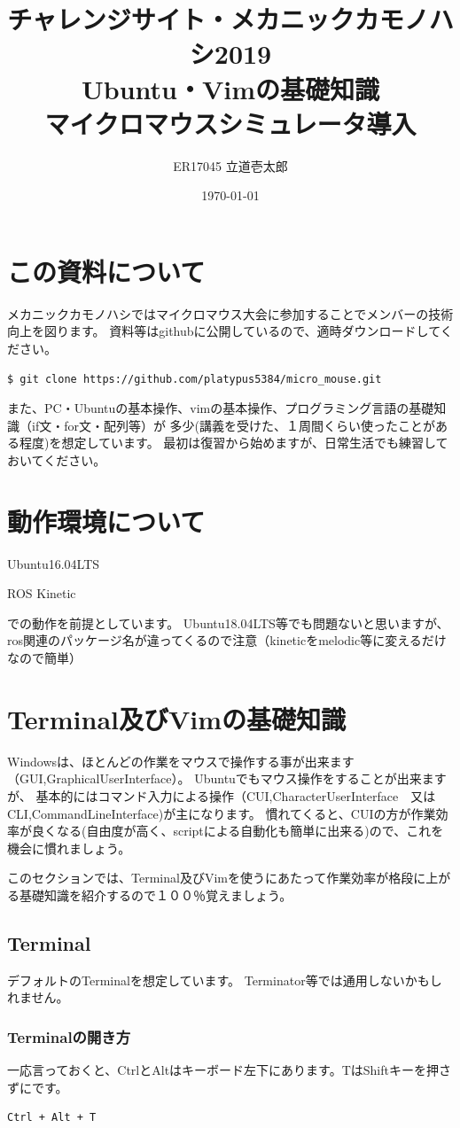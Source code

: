\documentclass[11pt,a4paper]{jsarticle}
\title{チャレンジサイト・メカニックカモノハシ2019\\Ubuntu・Vimの基礎知識\\マイクロマウスシミュレータ導入}
\author{ER17045 立道壱太郎}
\date{\today}
\begin{document}
\maketitle
%
%
\section{この資料について}
メカニックカモノハシではマイクロマウス大会に参加することでメンバーの技術向上を図ります。
資料等はgithubに公開しているので、適時ダウンロードしてください。

\begin{lstlisting}[frame=single]
$ git clone https://github.com/platypus5384/micro_mouse.git
\end{lstlisting}

また、PC・Ubuntuの基本操作、vimの基本操作、プログラミング言語の基礎知識（if文・for文・配列等）が
多少(講義を受けた、１周間くらい使ったことがある程度)を想定しています。
最初は復習から始めますが、日常生活でも練習しておいてください。


\section{動作環境について}
Ubuntu16.04LTS

ROS Kinetic

での動作を前提としています。
Ubuntu18.04LTS等でも問題ないと思いますが、ros関連のパッケージ名が違ってくるので注意（kineticをmelodic等に変えるだけなので簡単）


\newpage

\section{Terminal及びVimの基礎知識}
Windowsは、ほとんどの作業をマウスで操作する事が出来ます（GUI,GraphicalUserInterface）。
Ubuntuでもマウス操作をすることが出来ますが、
基本的にはコマンド入力による操作（CUI,CharacterUserInterface　又はCLI,CommandLineInterface)が主になります。
慣れてくると、CUIの方が作業効率が良くなる(自由度が高く、scriptによる自動化も簡単に出来る)ので、これを機会に慣れましょう。

このセクションでは、Terminal及びVimを使うにあたって作業効率が格段に上がる基礎知識を紹介するので１００％覚えましょう。
\subsection{Terminal}
デフォルトのTerminalを想定しています。
Terminator等では通用しないかもしれません。
\subsubsection{Terminalの開き方}
一応言っておくと、CtrlとAltはキーボード左下にあります。TはShiftキーを押さずにです。
\begin{lstlisting}[frame=single]
Ctrl + Alt + T
\end{lstlisting}
\end{document}
